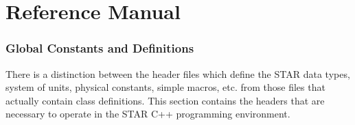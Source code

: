 \documentclass[twoside]{article}
\begin{document}
\clearpage

%
%
\part{Reference Manual}
\clearpage

\section{Global Constants and Definitions}
There is a distinction between the header files which define
the STAR data types, system of units, physical constants,
simple macros, etc. from those files that actually contain
class definitions.  This section contains the headers that
are necessary to operate in the STAR C++ programming environment.


\end{document}
